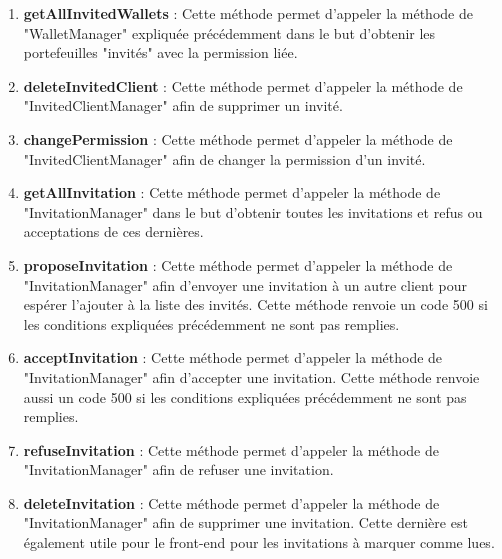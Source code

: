 \begin{enumerate}
\item \textbf{getAllInvitedWallets} :\newline
Cette méthode permet d'appeler la méthode de "WalletManager" expliquée précédemment dans le but d'obtenir les portefeuilles "invités" avec la permission liée. 
\item \textbf{deleteInvitedClient} :\newline
Cette méthode permet d'appeler la méthode de "InvitedClientManager" afin de supprimer un invité. 
\item \textbf{changePermission} :\newline
Cette méthode permet d'appeler la méthode de "InvitedClientManager" afin de changer la permission d'un invité. 
\item \textbf{getAllInvitation} :\newline
Cette méthode permet d'appeler la méthode de "InvitationManager" dans le but d'obtenir toutes les invitations et refus ou acceptations de ces dernières. 
\item \textbf{proposeInvitation} :\newline
Cette méthode permet d'appeler la méthode de "InvitationManager" afin d'envoyer une invitation à un autre client pour espérer l'ajouter à la liste des invités. 
Cette méthode renvoie un code 500 si les conditions expliquées précédemment ne sont pas remplies.
\item \textbf{acceptInvitation} :\newline
Cette méthode permet d'appeler la méthode de "InvitationManager" afin d'accepter une invitation. 
Cette méthode renvoie aussi un code 500 si les conditions expliquées précédemment ne sont pas remplies.
\item \textbf{refuseInvitation} :\newline
Cette méthode permet d'appeler la méthode de "InvitationManager" afin de refuser une invitation. 
\item \textbf{deleteInvitation} :\newline
Cette méthode permet d'appeler la méthode de "InvitationManager" afin de supprimer une invitation. 
Cette dernière est également utile pour le front-end pour les invitations à marquer comme lues.
\end{enumerate}
